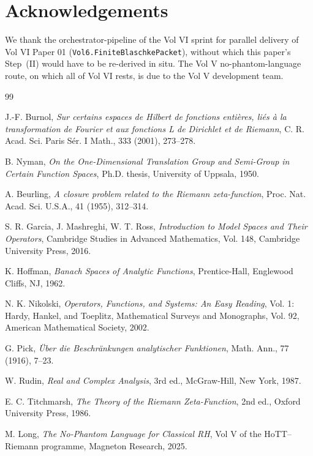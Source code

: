 \documentclass[12pt]{article}
\theoremstyle{definition}
\theoremstyle{remark}
\begin{document}
\section*{Acknowledgements}

We thank the orchestrator-pipeline of the Vol VI sprint for parallel
delivery of Vol VI Paper 01 (\texttt{Vol6.FiniteBlaschkePacket}), without
which this paper's Step~(II) would have to be re-derived in situ. The
Vol V no-phantom-language route, on which all of Vol VI rests, is due to
the Vol V development team.

\begin{thebibliography}{99}

J.-F. Burnol, \emph{Sur certains espaces de Hilbert de fonctions
enti\`eres, li\'es \`a la transformation de Fourier et aux fonctions L
de Dirichlet et de Riemann}, C. R. Acad. Sci. Paris S\'er. I Math.,
333 (2001), 273--278.

B. Nyman, \emph{On the One-Dimensional Translation Group and
Semi-Group in Certain Function Spaces}, Ph.D. thesis, University of
Uppsala, 1950.

A. Beurling, \emph{A closure problem related to the Riemann
zeta-function}, Proc. Nat. Acad. Sci. U.S.A., 41 (1955), 312--314.

S. R. Garcia, J. Mashreghi, W. T. Ross, \emph{Introduction to Model
Spaces and Their Operators}, Cambridge Studies in Advanced
Mathematics, Vol. 148, Cambridge University Press, 2016.

K. Hoffman, \emph{Banach Spaces of Analytic Functions}, Prentice-Hall,
Englewood Cliffs, NJ, 1962.

N. K. Nikolski, \emph{Operators, Functions, and Systems: An Easy
Reading}, Vol. 1: Hardy, Hankel, and Toeplitz, Mathematical Surveys
and Monographs, Vol. 92, American Mathematical Society, 2002.

G. Pick, \emph{\"Uber die Beschr\"ankungen analytischer Funktionen},
Math. Ann., 77 (1916), 7--23.

W. Rudin, \emph{Real and Complex Analysis}, 3rd ed., McGraw-Hill, New
York, 1987.

E. C. Titchmarsh, \emph{The Theory of the Riemann Zeta-Function}, 2nd
ed., Oxford University Press, 1986.

M. Long, \emph{The No-Phantom Language for Classical RH}, Vol V of the
HoTT--Riemann programme, Magneton Research, 2025.


\end{thebibliography}
\end{document}
